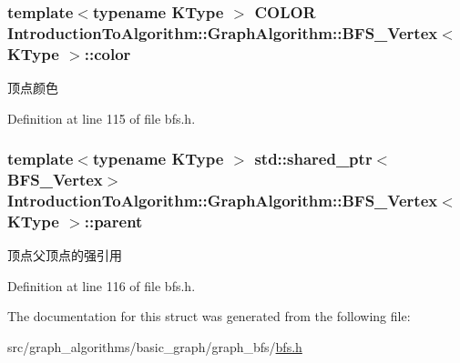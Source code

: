 \subsubsection[{color}]{\setlength{\rightskip}{0pt plus 5cm}template$<$typename K\+Type $>$ {\bf C\+O\+L\+O\+R} {\bf Introduction\+To\+Algorithm\+::\+Graph\+Algorithm\+::\+B\+F\+S\+\_\+\+Vertex}$<$ K\+Type $>$\+::color}\label{struct_introduction_to_algorithm_1_1_graph_algorithm_1_1_b_f_s___vertex_a7ab527ab8514bcb65e56edbe62b28fbb}
顶点颜色 

Definition at line 115 of file bfs.\+h.

\hypertarget{struct_introduction_to_algorithm_1_1_graph_algorithm_1_1_b_f_s___vertex_a11202710469656d7fb04635430355c41}{}
\subsubsection[{parent}]{\setlength{\rightskip}{0pt plus 5cm}template$<$typename K\+Type $>$ std\+::shared\+\_\+ptr$<${\bf B\+F\+S\+\_\+\+Vertex}$>$ {\bf Introduction\+To\+Algorithm\+::\+Graph\+Algorithm\+::\+B\+F\+S\+\_\+\+Vertex}$<$ K\+Type $>$\+::parent}\label{struct_introduction_to_algorithm_1_1_graph_algorithm_1_1_b_f_s___vertex_a11202710469656d7fb04635430355c41}
顶点父顶点的强引用 

Definition at line 116 of file bfs.\+h.



The documentation for this struct was generated from the following file\+:\begin{DoxyCompactItemize}
\item 
src/graph\+\_\+algorithms/basic\+\_\+graph/graph\+\_\+bfs/\hyperlink{bfs_8h}{bfs.\+h}\end{DoxyCompactItemize}
